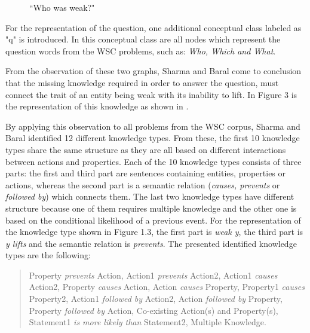 \begin{figure}
	\centering
	
	\caption{\label{Graph12}``Who was weak?"}
\end{figure}

For the representation of the question, one additional conceptual class labeled as "q" is introduced. In this conceptual class are all nodes which represent the question words from the WSC problems, such as: \textit{Who, Which and What}.

From the observation of these two graphs, Sharma and Baral \cite{2018CommonsenseKT} come to conclusion that the missing knowledge required in order to answer the question, must connect the trait of an entity being weak with its inability to lift. In Figure 3 is the representation of this knowledge as shown in \cite{2018CommonsenseKT}. 

\begin{comment}
	content...

\begin{figure}
	\centering
	
	\caption{\label{Graph13}``Prevents type?"}
\end{figure}
\end{comment}

By applying this observation to all problems from the WSC corpus, Sharma and Baral \cite{2018CommonsenseKT} identified 12 different knowledge types. From these, the first 10 knowledge types share the same structure as they are all based on different interactions between actions and properties. Each of the 10 knowledge types consists of three parts: the first and third part are sentences containing entities, properties or actions, whereas the second part is a semantic relation (\textit{causes, prevents} or \textit{followed by}) which connects them. The last two knowledge types have different structure because one of them requires multiple knowledge and the other one is based on the conditional likelihood of a previous event. 
For the representation of the knowledge type shown in Figure 1.3, the first part is \textit{weak y}, the third part is \textit{y lifts} and the semantic relation is \textit{prevents}.
The presented identified knowledge types are the following:

\begin{quote} 
	Property \textit{prevents} Action, Action1 \textit{prevents} Action2, Action1 \textit{causes} Action2, Property \textit{causes} Action, Action \textit{causes} Property, Property1 \textit{causes} Property2, Action1 \textit{followed by} Action2, Action \textit{followed by} Property, Property \textit{followed by} Action, Co-existing Action(s) and Property(s), Statement1 \textit{is more likely than} Statement2, Multiple Knowledge. 
\end{quote}


